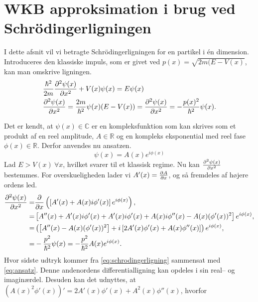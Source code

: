 \section{WKB approksimation i brug ved Schrödingerligningen}
I dette afsnit vil vi betragte Schrödingerligningen for en partikel i én dimension. Introduceres den klassiske impuls, som er givet ved $p(x) = \sqrt{2m(E-V(x)}$, kan man omskrive ligningen.
%
\begin{align}
    & \frac{\hbar^2}{2m} \pdiff[2]{\psi(x)}{x} + V(x)\psi(x) = E\psi(x) \\
    & \pdiff[2]{\psi(x)}{x} = \frac{2m}{\hbar^2}\psi(x)(E - V(x))  = \pdiff[2]{\psi(x)}{x} = - \frac{p(x)^2}{\hbar^2}\psi(x).
    \label{eq:schrodingerligning}
\end{align}

Det er kendt, at $\psi(x) \in \mathbb{C}$ er en kompleksfunktion som kan skrives som et produkt af en reel amplitude, $A \in \mathbb{R}$ og en kompleks eksponential med reel fase $\phi(x)\in \mathbb{R}$. Derfor anvendes nu ansatzen.
\begin{equation}
    \psi(x) = A(x) e^{i \phi(x)}
    \label{eq:ansatz}
\end{equation}
Lad $E > V(x) \ \forall x$, hvilket svarer til et klassisk regime.
Nu kan $\pdiff[2]{\psi(x)}{x}$ bestemmes. For overskueligheden lader vi $A'(x) = \pdiff{A}{x}$, og så fremdeles af højere ordens led.
\begin{align}
    \pdiff[2]{\psi(x)}{x} = & \pdiff{}{x}\left( \left[ A'(x) + A(x)i\phi'(x) \right]e^{i\phi(x)} \right), \\
    = & \left[ A''(x) + A'(x)i\phi'(x) + A'(x)i\phi'(x) + A(x)i\phi''(x) - A(x)( \phi'(x))^2\right]e^{i\phi(x)}, \\
    = & \left(\left[ A''(x) - A(x)(\phi'(x))^2\right] + i \left[2A'(x)\phi'(x) + A(x)\phi''(x) \right]\right)e^{i\phi(x)},\\
    = & -\frac{p^2}{\hbar^2}\psi(x) = -\frac{p^2}{\hbar^2} A(x)e^{i\phi(x)}.
    \label{eq:regime}
\end{align}
Hvor sidste udtryk kommer fra \cref{eq:schrodingerligning} sammensat med \cref{eq:ansatz}.
Denne andenordens differentialligning kan opdeles i sin real-- og imaginærdel. Desuden kan det udnyttes, at $\left( A(x)^2\phi'(x) \right)' = 2A'(x)\phi'(x) + A^2(x)\phi''(x)$, hvorfor

